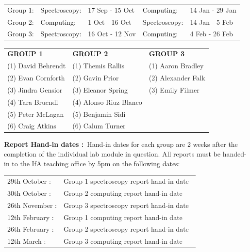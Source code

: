 \documentclass[12pt]{article}
\begin{document}
\begin{center}
\begin{tabular}{lllll}
Group 1: & Spectroscopy: & 17 Sep - 15 Oct & Computing:    & 14 Jan - 29 Jan\\
Group 2: & Computing:    &  1 Oct - 16 Oct & Spectroscopy: & 14 Jan - 5 Feb\\
Group 3: & Spectroscopy: & 16 Oct - 12 Nov & Computing:    &  4 Feb - 26 Feb
\end{tabular}
\end{center}

\begin{center}
\begin{tabular}{lll}

{\bf GROUP 1}      &   {\bf GROUP 2}        & {\bf GROUP 3}     \\
(1) David Behrendt & (1) Themis Rallis      & (1) Aaron Bradley \\
(2) Evan Cornforth & (2) Gavin Prior        & (2) Alexander Falk\\
(3) Jindra Gensior & (3) Eleanor Spring     & (3) Emily Filmer  \\
(4) Tara Bruendl   & (4) Alonso Riuz Blanco & \\
(5) Peter McLagan  & (5) Benjamin Sidi      & \\
(6) Craig Atkins   & (6) Calum Turner       & \\

\end{tabular}
\end{center}


{\bf Report Hand-in dates :}\  Hand-in dates for each group are 2 weeks after the completion of the individual lab module in question. All reports must be handed-in to the IfA teaching office by 5pm on the following dates:\\

\begin{center}
\begin{tabular}{ll}
29th October :  & Group 1 spectroscopy report hand-in date\ \\
30th October :  & Group 2 computing report hand-in date\\
26th November : & Group 3 spectroscopy report hand-in date\\
12th February : & Group 1 computing report hand-in date\\
26th February : & Group 2 spectroscopy report hand-in date\\
12th March :    & Group 3 computing report hand-in date
\end{tabular}
\end{center}
\end{document}
